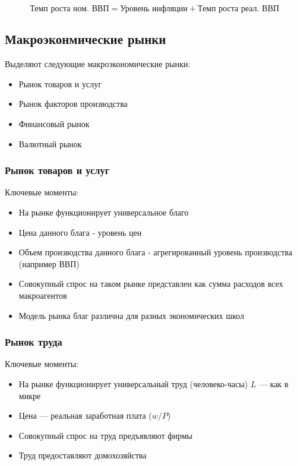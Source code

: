 \documentclass{article}
\begin{document}
    \begin{equation}
        \text{Темп роста ном. ВВП} = \text{Уровень инфляции} + \text{Темп роста реал. ВВП}
    \end{equation}


    \subsection{Макроэконмические рынки}

    Выделяют следующие макроэкономические рынки:

    \begin{itemize}
        \item Рынок товаров и услуг
        \item Рынок факторов производства
        \item Финансовый рынок
        \item Валютный рынок
    \end{itemize}
    
    \subsubsection{Рынок товаров и услуг}

    Ключевые моменты:

    \begin{itemize}
        \item На рынке функционирует универсальное благо
        \item Цена данного блага - уровень цен
        \item Объем производства данного блага - агрегированный уровень производства (например ВВП)
        \item Совокупный спрос на таком рынке представлен как сумма расходов всех макроагентов
        \item Модель рынка благ различна для разных экономических школ
    \end{itemize}


    \subsubsection{Рынок труда}

    Ключевые моменты:

    \begin{itemize}
        \item На рынке функционирует универсальный труд (человеко-часы) $L$ --- как в микре
        \item Цена --- реальная заработная плата ($w / P$)
        \item Совокупный спрос на труд предъявляют фирмы
        \item Труд предоставляют домохозяйства
    \end{itemize}
\end{document}
